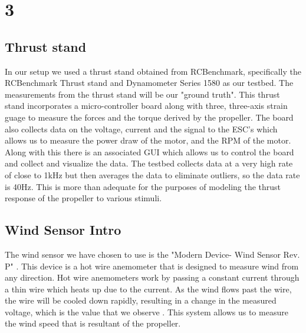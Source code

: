 \documentclass[conference]{IEEEtran}
\begin{document}
	\section{3}
	\subsection{Thrust stand}
	In our setup we used a thrust stand obtained from RCBenchmark, specifically the RCBenchmark Thrust stand and Dynamometer Series 1580 \cite{rcb} as our testbed. The measurements from the thrust stand will be our "ground truth". This thrust stand incorporates a micro-controller board along with three, three-axis strain guage to measure the forces and the torque derived by the propeller. The board also collects data on the voltage, current and the signal to the ESC's which allows us to measure the power draw of the motor, and the RPM of the motor. Along with this there is an associated GUI which allows us to control the board and collect and visualize the data. The testbed collects data at a very high rate of close to 1kHz but then averages the data to eliminate outliers, so the data rate is 40Hz. This is more than adequate for the purposes of modeling the thrust response of the propeller to various stimuli. 
	\subsection{Wind Sensor Intro}
	The wind sensor we have chosen to use is the "Modern Device- Wind Sensor Rev. P" \cite{md}. This device is a hot wire anemometer that is designed to measure wind from any direction. Hot wire anemometers work by passing a constant current through a thin wire which heats up due to the current. As the wind flows past the wire, the wire will be cooled down rapidly, resulting in a change in the measured voltage, which is the value that we observe \cite{hot_wire}. This system allows us to measure the wind speed that is resultant of the propeller. 
\end{document}
